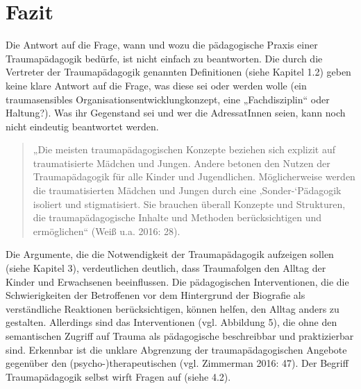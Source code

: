 \section{Fazit}
Die Antwort auf die Frage, wann und wozu die pädagogische Praxis einer Traumap{\"a}dagogik bedürfe, ist nicht einfach zu beantworten. Die durch die Vertreter der Traumap{\"a}dagogik genannten Definitionen (siehe Kapitel 1.2) geben keine klare Antwort auf die Frage, was diese sei oder werden wolle (ein traumasensibles Organisationsentwicklungkonzept, eine „Fachdisziplin“ oder Haltung?). Was ihr Gegenstand sei und wer die AdressatInnen seien, kann noch nicht eindeutig beantwortet werden.

\begin{quote}
\small{„Die meisten traumap{\"a}dagogischen Konzepte beziehen sich explizit auf traumatisierte M{\"a}dchen und Jungen. Andere betonen den Nutzen der Traumap{\"a}dagogik f{\"u}r alle Kinder und Jugendlichen. M{\"o}glicherweise werden die traumatisierten M{\"a}dchen und Jungen durch eine ‚Sonder-‘P{\"a}dagogik isoliert und stigmatisiert. Sie brauchen {\"u}berall Konzepte und Strukturen, die traumap{\"a}dagogische Inhalte und Methoden ber{\"u}cksichtigen und erm{\"o}glichen“ (Weiß u.a. 2016: 28).}
\end{quote}

Die Argumente, die die Notwendigkeit der Traumap{\"a}dagogik aufzeigen sollen (siehe Kapitel 3), verdeutlichen deutlich, dass Traumafolgen den Alltag der Kinder und Erwachsenen beeinflussen. Die pädagogischen Interventionen, die die Schwierigkeiten der Betroffenen vor dem Hintergrund der Biografie als verständliche Reaktionen berücksichtigen, können helfen, den Alltag anders zu gestalten. Allerdings sind das Interventionen (vgl. Abbildung 5), die ohne den semantischen Zugriff auf Trauma als pädagogische beschreibbar und praktizierbar sind. Erkennbar ist die unklare Abgrenzung der traumapädagogischen Angebote gegenüber den (psycho-)therapeutischen (vgl. Zimmerman 2016: 47). Der Begriff Traumapädagogik selbst wirft Fragen auf (siehe 4.2).

